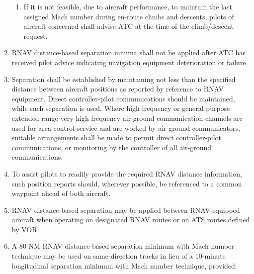 \begin{enumeratesc}
\begin{enumerate}
        \begin{enumerate}
            \item If it is not feasible, due to aircraft performance, to maintain the last assigned Mach number during en-route climbs and descents, pilots of aircraft concerned shall advise ATC at the time of the climb/descent request.
        \end{enumerate}

        \item RNAV distance-based separation minima shall not be applied after ATC has received pilot advice indicating navigation equipment deterioration or failure.
        \item Separation shall be established by maintaining not less than the specified distance between aircraft positions as reported by reference to RNAV equipment. Direct controller-pilot communications should be maintained, while such separation is used. Where high frequency or general purpose extended range very high frequency air-ground communication channels are used for area control service and are worked by air-ground communicators, suitable arrangements shall be made to permit direct controller-pilot communications, or monitoring by the controller of all air-ground communications.
        \item To assist pilots to readily provide the required RNAV distance information, such position reports should, wherever possible, be referenced to a common waypoint ahead of both aircraft.
        \item RNAV distance-based separation may be applied between RNAV-equipped aircraft when operating on designated RNAV routes or on ATS routes defined by VOR.
        \item A 80 NM RNAV distance-based separation minimum with Mach number technique may be used on same-direction tracks in lieu of a 10-minute longitudinal separation minimum with Mach number technique, provided:
        


\end{enumerate}
\end{enumeratesc}
